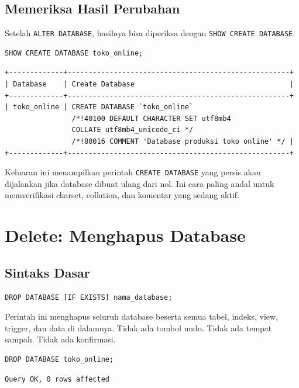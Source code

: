 \documentclass[11pt,a4paper]{article}
\begin{document}
\subsection{Memeriksa Hasil Perubahan}

Setelah \texttt{ALTER DATABASE}, hasilnya bisa diperiksa dengan \texttt{SHOW CREATE DATABASE}.

\begin{lstlisting}[style=code]
SHOW CREATE DATABASE toko_online;
\end{lstlisting}

\begin{lstlisting}[style=out]
+-------------+-----------------------------------------------------+
| Database    | Create Database                                     |
+-------------+-----------------------------------------------------+
| toko_online | CREATE DATABASE `toko_online`
                /*!40100 DEFAULT CHARACTER SET utf8mb4
                COLLATE utf8mb4_unicode_ci */
                /*!80016 COMMENT 'Database produksi toko online' */ |
+-------------+-----------------------------------------------------+
\end{lstlisting}

Keluaran ini menampilkan perintah \texttt{CREATE DATABASE} yang persis akan dijalankan jika database dibuat ulang dari nol. Ini cara paling andal untuk memverifikasi charset, collation, dan komentar yang sedang aktif.

\section{Delete: Menghapus Database}

\subsection{Sintaks Dasar}

\begin{lstlisting}[style=code]
DROP DATABASE [IF EXISTS] nama_database;
\end{lstlisting}

Perintah ini menghapus seluruh database beserta semua tabel, indeks, view, trigger, dan data di dalamnya. Tidak ada tombol undo. Tidak ada tempat sampah. Tidak ada konfirmasi.

\begin{lstlisting}[style=code]
DROP DATABASE toko_online;
\end{lstlisting}

\begin{lstlisting}[style=out]
Query OK, 0 rows affected
\end{lstlisting}
\end{document}
